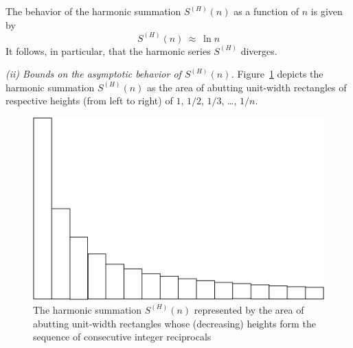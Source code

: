 \begin{prop}
\label{thm:harmonic}
The behavior of the harmonic summation $S^{(H)}(n)$ as a function of $n$ is given by
\[ S^{(H)}(n) \ \approx \ \ln n \]
It follows, in particular, that the harmonic series $S^{(H)}$ diverges.
\end{prop}

\bigskip

\noindent {}
\bigskip


{\it (ii) Bounds on the asymptotic behavior of $S^{(H)}(n)$.}
Figure~\ref{fig:HarmonicSumInitial} depicts the harmonic summation $S^{(H)}(n)$ as the area of abutting unit-width rectangles of respective heights (from left to right) of $1$, $1/2$, $1/3$, \ldots, $1/n$.
\begin{figure}[htb]
\centerline{
\includegraphics[scale=0.2]{FiguresMaths/HarmonicSumInitial}
}
\caption{The harmonic summation $S^{(H)}(n)$ represented by the area of abutting unit-width rectangles whose (decreasing) heights form the sequence of consecutive integer reciprocals}
\label{fig:HarmonicSumInitial}
\end{figure}

